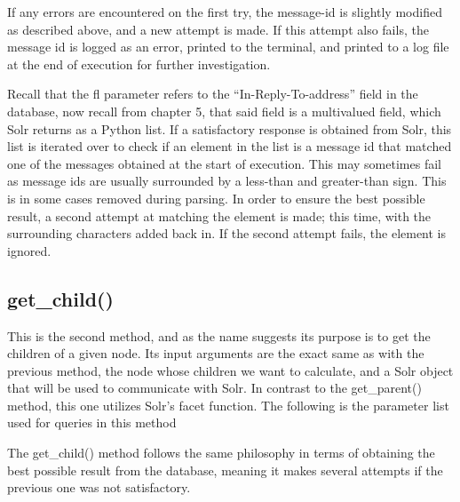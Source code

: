 \documentclass[a4paper,english]{report}
\begin{document}
If any errors are encountered on the first try, the message-id is slightly modified as described above, and a new attempt is made. If this attempt also fails, the message id is logged as an error, printed to the terminal, and printed to a log file at the end of execution for further investigation.





Recall that the fl parameter refers to the “In-Reply-To-address” field in the database, now recall from chapter 5, that said field is a multivalued field, which Solr returns as a Python list. If a satisfactory response is obtained from Solr, this list is iterated over to check if an element in the list is a message id that matched one of the messages obtained at the start of execution. 
This may sometimes fail as message ids are usually surrounded by a less-than and greater-than sign. This is in some cases removed during parsing. In order to ensure the best possible result, a second attempt at matching the element is made; this time, with the surrounding characters added back in.
If the second attempt fails, the element is ignored.\\







\subsection{get\_child()}


This is the second method, and as the name suggests its purpose is to get the children of a given node. Its input arguments are the exact same as with the previous method, the node whose children we want to calculate, and a Solr object that will be used to communicate with Solr. In contrast to the get\_parent() method, this one utilizes Solr’s facet function. The following is the parameter list used for queries in this method






The get\_child() method follows the same philosophy in terms of obtaining the best possible result from the database, meaning it makes several attempts if the previous one was not satisfactory.
\end{document}

